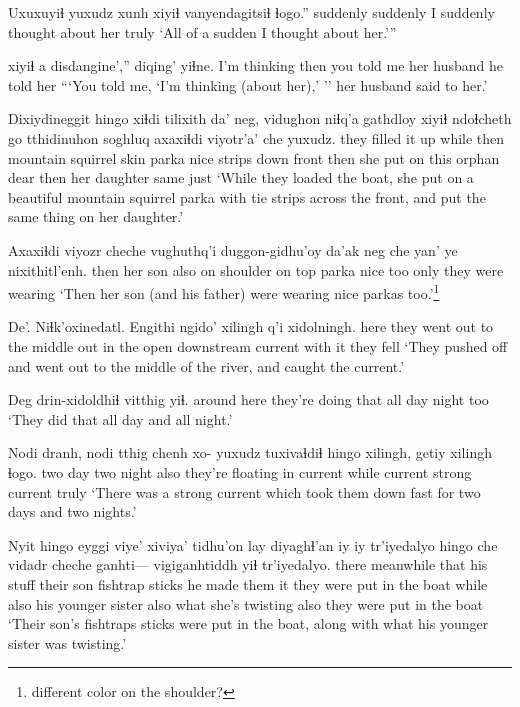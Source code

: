 \documentclass[12pt]{article}
\begin{document}
\gll Uxuxuyiɬ   yuxudz {xunh xiyiɬ} vanyendagitsiɬ      ɬogo.''
suddenly  {}      suddenly   {I suddenly thought about her} truly
\glt `All of a sudden I thought about her.'''
\glend

 xiyiɬ a disdangine','' diqing' yiɬne.
{I'm thinking} then {} {you told me} {her husband} {he told her}
\glt ```You told me, `I'm thinking (about her),' '' her husband said to her.'
\glend

\gll Dixiydineggit     hingo xiɬdi tilixith          da'   neg,  {vidughon niɬq'a gathdloy} xiyiɬ  ndoɬcheth  go   tthidinuhon soghluq axaxiɬdi viyotr'a' che yuxudz.
{they filled it up} while then  {mountain squirrel skin} parka nice {strips down front} then {she put on} this orphan      dear    then   {her daughter} same just
\glt `While they loaded the boat, she put on a beautiful mountain squirrel parka with tie strips across the front, and put the same thing on her daughter.'  
\glend

\gll Axaxiɬdi viyozr  cheche {vughuthq'i} {duggon-gidhu'oy} da'ak   neg  che yan' {ye nixithitl'enh.}
then   {her son} also {on shoulder} {on top}  parka nice too only   {they were wearing}
\glt `Then her son (and his father) were wearing nice parkas too.'\footnote{different color on the shoulder?}
\glend

\gll De'.  Niɬk'oxinedatl.              Engithi          ngido'     xilingh q'i xidolningh.
here {they went out to the middle} {out in the open} downstream current {with it} {they fell}
\glt `They pushed off and went out to the middle of the river, and caught the current.'
\glend

\gll Deg           drin-xidoldhiɬ      vitthig yiɬ.
{around here} {they're doing that all day} night   too
\glt `They did that all day and all night.'
\glend

\gll Nodi dranh, nodi tthig  chenh xo- yuxudz tuxivaɬdiɬ       hingo xilingh, getiy  xilingh ɬogo.
two  day   two  night also  {} {}      {they're floating in current} while current strong current truly
\glt `There was a strong current which took them down fast for two days and two nights.'
\glend

\gll Nyit  hingo     eyggi viye'     xiviya'   tidhu'on lay    {diyaghɬ'an iy}  iy tr'iyedalyo              hingo che vidadr        cheche ganhti--- vigiganhtiddh  yiɬ     tr'iyedalyo.
there meanwhile that  {his stuff} {their son} fishtrap sticks {he made them} it {they were put in the boat} while also {his younger sister} also  {} {what she's twisting} also {they were put in the boat}
\glt `Their son's fishtraps sticks were put in the boat, along with what his younger sister was twisting.'
\glend
\end{document}
